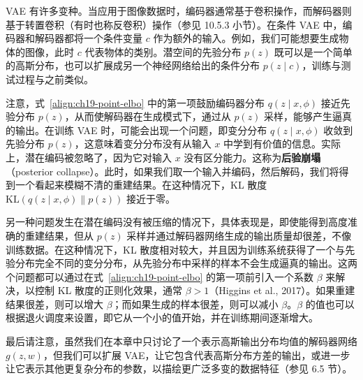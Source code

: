 \documentclass[../../main.tex]{subfiles}
\begin{document}
VAE 有许多变种。当应用于图像数据时，编码器通常基于卷积操作，而解码器则基于转置卷积（有时也称反卷积）操作（参见 10.5.3 小节）。在条件 VAE 中，编码器和解码器都将一个条件变量 $c$ 作为额外的输入。例如，我们可能想要生成物体的图像，此时 $c$ 代表物体的类别。潜空间的先验分布 $p(z)$ 既可以是一个简单的高斯分布，也可以扩展成另一个神经网络给出的条件分布 $p(z\mid c)$，训练与测试过程与之前类似。

注意，式~\eqref{align:ch19-point-elbo} 中的第一项鼓励编码器分布 $q(z\mid x,\phi)$ 接近先验分布 $p(z)$，从而使解码器在生成模式下，通过从 $p(z)$ 采样，能够产生逼真的输出。在训练 VAE 时，可能会出现一个问题，即变分分布 $q(z\mid x,\phi)$ 收敛到先验分布 $p(z)$，这意味着变分分布没有从输入 $x$ 中学到有价值的信息。实际上，潜在编码被忽略了，因为它对输入 $x$ 没有区分能力。这称为\textbf{后验崩塌}（posterior collapse）。此时，如果我们取一个输入并编码，然后解码，我们将得到一个看起来模糊不清的重建结果。在这种情况下，KL 散度 $\mathrm{KL}(q(z\mid x,\phi)\|p(z))$ 接近于零。

另一种问题发生在潜在编码没有被压缩的情况下，具体表现是，即使能得到高度准确的重建结果，但从 $p(z)$ 采样并通过解码器网络生成的输出质量却很差，不像训练数据。在这种情况下，KL 散度相对较大，并且因为训练系统获得了一个与先验分布完全不同的变分分布，从先验分布中采样的样本不会生成逼真的输出。这两个问题都可以通过在式~\eqref{align:ch19-point-elbo} 的第一项前引入一个系数 $\beta$ 来解决，以控制 KL 散度的正则化效果，通常 $\beta>1$（Higgins et al., 2017）。如果重建结果很差，则可以增大 $\beta$；而如果生成的样本很差，则可以减小 $\beta$。$\beta$ 的值也可以根据退火调度来设置，即它从一个小的值开始，并在训练期间逐渐增大。

最后请注意，虽然我们在本章中只讨论了一个表示高斯输出分布均值的解码器网络 $g(z,w)$，但我们可以扩展 VAE，让它包含代表高斯分布方差的输出，或进一步让它表示其他更复杂分布的参数，以描绘更广泛多变的数据特征（参见 6.5 节）。
\end{document}
